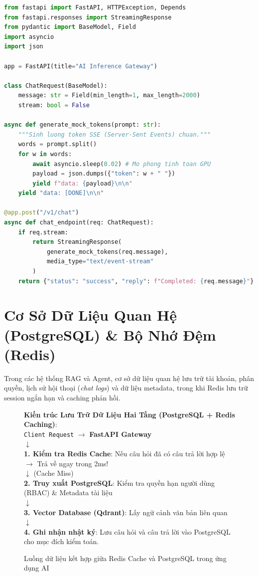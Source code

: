 \begin{lstlisting}[language=Python]
from fastapi import FastAPI, HTTPException, Depends
from fastapi.responses import StreamingResponse
from pydantic import BaseModel, Field
import asyncio
import json

app = FastAPI(title="AI Inference Gateway")

class ChatRequest(BaseModel):
    message: str = Field(min_length=1, max_length=2000)
    stream: bool = False

async def generate_mock_tokens(prompt: str):
    """Sinh luong token SSE (Server-Sent Events) chuan."""
    words = prompt.split()
    for w in words:
        await asyncio.sleep(0.02) # Mo phong tinh toan GPU
        payload = json.dumps({"token": w + " "})
        yield f"data: {payload}\n\n"
    yield "data: [DONE]\n\n"

@app.post("/v1/chat")
async def chat_endpoint(req: ChatRequest):
    if req.stream:
        return StreamingResponse(
            generate_mock_tokens(req.message),
            media_type="text/event-stream"
        )
    return {"status": "success", "reply": f"Completed: {req.message}"}
\end{lstlisting}

\section{Cơ Sở Dữ Liệu Quan Hệ (PostgreSQL) \& Bộ Nhớ Đệm (Redis)}
\label{sec:sys-db-redis}

Trong các hệ thống RAG và Agent, cơ sở dữ liệu quan hệ lưu trữ tài khoản, phân quyền, lịch sử hội thoại (\textit{chat logs}) và dữ liệu metadata, trong khi Redis lưu trữ session ngắn hạn và caching phản hồi.

\begin{figure}[htbp]
\centering
\begin{tcolorbox}[colback=boxbg,colframe=primarycolor,width=0.95\textwidth,arc=2pt]
\small
\textbf{Kiến trúc Lưu Trữ Dữ Liệu Hai Tầng (PostgreSQL + Redis Caching)}:\\[0.2cm]
\texttt{Client Request} $\longrightarrow$ \textbf{FastAPI Gateway}\\
$\downarrow$\\
\textbf{1. Kiểm tra Redis Cache}: Nếu câu hỏi đã có câu trả lời hợp lệ $\longrightarrow$ Trả về ngay trong 2ms!\\
$\downarrow$ (Cache Miss)\\
\textbf{2. Truy xuất PostgreSQL}: Kiểm tra quyền hạn người dùng (RBAC) \& Metadata tài liệu\\
$\downarrow$\\
\textbf{3. Vector Database (Qdrant)}: Lấy ngữ cảnh văn bản liên quan\\
$\downarrow$\\
\textbf{4. Ghi nhận nhật ký}: Lưu câu hỏi và câu trả lời vào PostgreSQL cho mục đích kiểm toán.
\end{tcolorbox}
\caption{Luồng dữ liệu kết hợp giữa Redis Cache và PostgreSQL trong ứng dụng AI}
\label{fig:db-caching-flow}
\end{figure}

